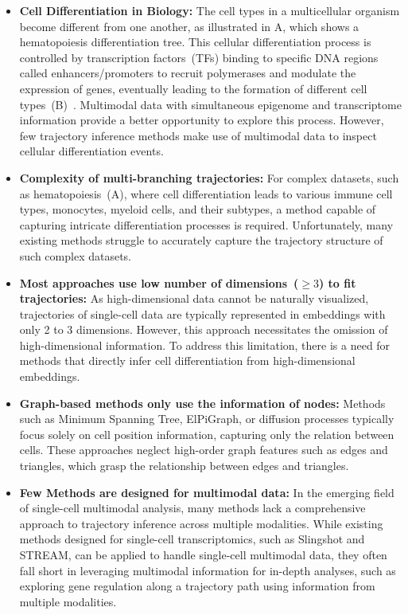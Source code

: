 \begin{itemize}
	\item \textbf{Cell Differentiation in Biology:}
	The cell types in a multicellular organism become different from one another, as illustrated in A, which shows a hematopoiesis differentiation tree. This cellular differentiation process is controlled by transcription factors~(TFs) binding to specific DNA regions called enhancers/promoters to recruit polymerases and modulate the expression of genes, eventually leading to the formation of different cell types~(B)~\citep{costa2023dissecting}. Multimodal data with simultaneous epigenome and transcriptome information provide a better opportunity to explore this process. However, few trajectory inference methods make use of multimodal data to inspect cellular differentiation events.


	\item \textbf{Complexity of multi-branching trajectories:}
	For complex datasets, such as hematopoiesis~(A), where cell differentiation leads to various immune cell types, monocytes, myeloid cells, and their subtypes, a method capable of capturing intricate differentiation processes is required. Unfortunately, many existing methods struggle to accurately capture the trajectory structure of such complex datasets.


	\item \textbf{Most approaches use low number of dimensions~($\geq3$) to fit trajectories:}
	As high-dimensional data cannot be naturally visualized, trajectories of single-cell data are typically represented in embeddings with only 2 to 3 dimensions. However, this approach necessitates the omission of high-dimensional information. To address this limitation, there is a need for methods that directly infer cell differentiation from high-dimensional embeddings.

	\item \textbf{Graph-based methods only use the information of nodes:}
	Methods such as Minimum Spanning Tree, ElPiGraph, or diffusion processes typically focus solely on cell position information, capturing only the relation between cells. These approaches neglect high-order graph features such as edges and triangles, which grasp the relationship between edges and triangles.

	\item \textbf{Few Methods are designed for multimodal data:}
	In the emerging field of single-cell multimodal analysis, many methods lack a comprehensive approach to trajectory inference across multiple modalities. While existing methods designed for single-cell transcriptomics, such as Slingshot and STREAM, can be applied to handle single-cell multimodal data, they often fall short in leveraging multimodal information for in-depth analyses, such as exploring gene regulation along a trajectory path using information from multiple modalities.
\end{itemize}

